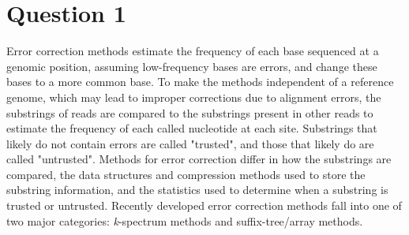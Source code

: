 \section{Question 1}

Error correction methods estimate the frequency of each base sequenced at a genomic position, assuming low-frequency bases are errors, and change these bases to a more common base.
To make the methods independent of a reference genome, which may lead to improper corrections due to alignment errors, the substrings of reads are compared to the substrings present in other reads to estimate the frequency of each called nucleotide at each site.
Substrings that likely do not contain errors are called "trusted", and those that likely do are called "untrusted".
Methods for error correction differ in how the substrings are compared, the data structures and compression methods used to store the substring information, and the statistics used to determine when a substring is trusted or untrusted.
Recently developed error correction methods fall into one of two major categories: \textit{k}-spectrum methods and suffix-tree/array methods.


